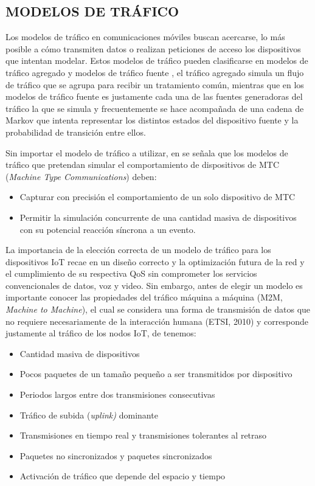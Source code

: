 \break
\subsection{MODELOS DE TRÁFICO}

Los modelos de tráfico en comunicaciones móviles buscan acercarse, lo más posible a cómo transmiten datos o realizan peticiones de acceso los dispositivos que intentan modelar. Estos modelos de tráfico pueden clasificarse en modelos de tráfico\textbf{ }agregado y modelos de tráfico fuente \parencite{Laner2013}, el tráfico agregado simula un flujo de tráfico que se agrupa para recibir un tratamiento común, mientras que en los modelos de tráfico fuente es justamente cada una de las fuentes generadoras del tráfico la que se simula y frecuentemente se hace acompañada de una cadena de Markov que intenta representar los distintos estados del dispositivo fuente y la probabilidad de transición entre ellos.\newline

Sin importar el modelo de tráfico a utilizar, en \parencite{Laner2013} se señala que los modelos de tráfico que pretendan simular el comportamiento de dispositivos de MTC (\textit{Machine Type Communications}) deben:

\begin{itemize}
\item  Capturar con precisión el comportamiento de un solo dispositivo de MTC 
\item  Permitir la simulación concurrente de una cantidad masiva de dispositivos con su potencial reacción síncrona a un evento.
\end{itemize}

La importancia de la elección correcta de un modelo de tráfico para los dispositivos IoT recae en un diseño correcto y la optimización futura de la red y el cumplimiento de su respectiva QoS sin comprometer los servicios convencionales de datos, voz y video. Sin embargo, antes de elegir un modelo es importante conocer las propiedades del tráfico máquina a máquina (M2M, \textit{Machine to Machine}), el cual se considera una forma de transmisión de datos que no requiere necesariamente de la interacción humana (ETSI, 2010) y corresponde justamente al tráfico de los nodos IoT, de \parencite{Laner2013} tenemos:

\begin{itemize}
\item  Cantidad masiva de dispositivos
\item  Pocos paquetes de un tamaño pequeño a ser transmitidos por dispositivo
\item  Periodos largos entre dos transmisiones consecutivas
\item  Tráfico de subida (\textit{uplink)} dominante
\item  Transmisiones en tiempo real y transmisiones tolerantes al retraso
\item  Paquetes no sincronizados y paquetes sincronizados
\item  Activación de tráfico que depende del espacio y tiempo
\end{itemize}

